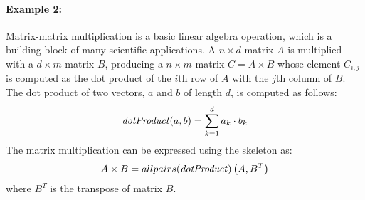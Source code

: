 \paragraph{Example 2:}
Matrix-matrix multiplication is a basic linear algebra operation, which is a building block of many scientific applications.
A $n\times d$ matrix $A$ is multiplied with a $d\times m$ matrix $B$, producing a $n\times m$ matrix $C=A\times B$ whose element $C_{i,j}$ is computed as the dot product of the $i$th row of $A$ with the $j$th column of $B$.
The dot product of two vectors, $a$ and $b$ of length $d$, is computed as follows:
\begin{equation}
  \mbox{\emph{dotProduct}} (a,b) = \sum_{k=1}^d a_k \cdot b_k
\end{equation}
The matrix multiplication can be expressed using the \allpairs skeleton as:
\begin{equation}
  A\times B = allpairs(\mbox{\emph{dotProduct}})\left(A, B^T\right)
  \label{eq:mat_mult_allpairs}
\end{equation}
where $B^T$ is the transpose of matrix $B$.

% 



